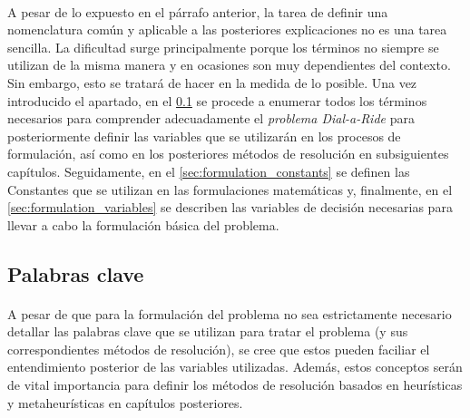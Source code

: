 \documentclass{subfiles}
\begin{document}
      \paragraph{}
      A pesar de lo expuesto en el párrafo anterior, la tarea de definir una nomenclatura común y aplicable a las posteriores explicaciones no es una tarea sencilla. La dificultad surge principalmente porque los términos no siempre se utilizan de la misma manera y en ocasiones son muy dependientes del contexto. Sin embargo, esto se tratará de hacer en la medida de lo posible. Una vez introducido el apartado, en el \cref{sec:formulation_keywords} se procede a enumerar todos los términos necesarios para comprender adecuadamente el \emph{problema Dial-a-Ride} para posteriormente definir las variables que se utilizarán en los procesos de formulación, así como en los posteriores métodos de resolución en subsiguientes capítulos. Seguidamente, en el \cref{sec:formulation_constants} se definen las Constantes que se utilizan en las formulaciones matemáticas y, finalmente, en el \cref{sec:formulation_variables} se describen las variables de decisión necesarias para llevar a cabo la formulación básica del problema.

      \subsection{Palabras clave}
      \label{sec:formulation_keywords}

        \paragraph{}
        A pesar de que para la formulación del problema no sea estrictamente necesario detallar las palabras clave que se utilizan para tratar el problema (y sus correspondientes métodos de resolución), se cree que estos pueden faciliar el entendimiento posterior de las variables utilizadas. Además, estos conceptos serán de vital importancia para definir los métodos de resolución basados en heurísticas y metaheurísticas en capítulos posteriores.
\end{document}
